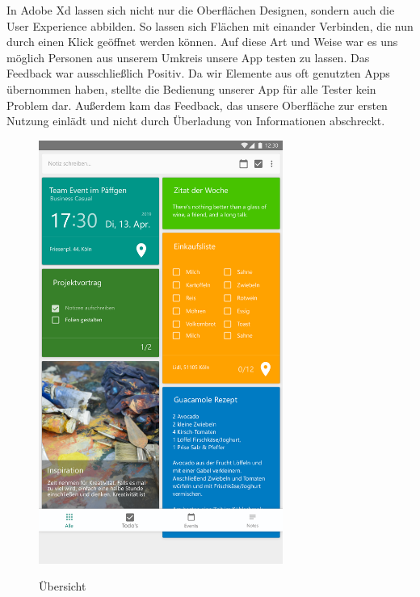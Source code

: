 In Adobe Xd lassen sich nicht nur die Oberflächen Designen, sondern auch die User Experience abbilden. So lassen sich Flächen mit einander Verbinden, die nun durch einen Klick geöffnet werden können. Auf diese Art und Weise war es uns möglich Personen aus unserem Umkreis unsere App testen zu lassen. Das Feedback war ausschließlich Positiv. Da wir Elemente aus oft genutzten Apps übernommen haben, stellte die Bedienung unserer App für alle Tester kein Problem dar. Außerdem kam das Feedback, das unsere Oberfläche zur ersten Nutzung einlädt und nicht durch Überladung von Informationen abschreckt.
\begin{figure}[H]
\caption{Übersicht}
\centering
\includegraphics[width=8cm]{img/OverviewActivity.pdf}
	\label{img:OverviewActivity}
\end{figure}

